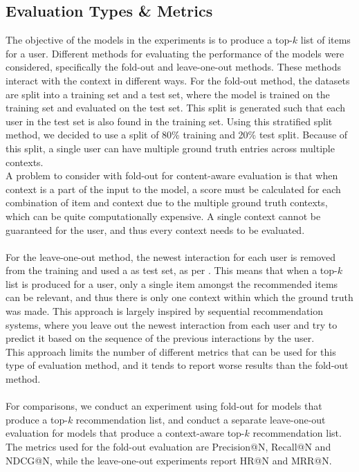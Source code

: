 \subsection{Evaluation Types \& Metrics}\label{subsec:evalandmetrics}
The objective of the models in the experiments is to produce a top-$k$ list of items for a user. 
Different methods for evaluating the performance of the models were considered, specifically the fold-out and leave-one-out methods.
These methods interact with the context in different ways.
For the fold-out method, the datasets are split into a training set and a test set, where the model is trained on the training set and evaluated on the test set. 
This split is generated such that each user in the test set is also found in the training set.
Using this stratified split method, we decided to use a split of 80\% training and 20\% test split.
Because of this split, a single user can have multiple ground truth entries across multiple contexts.\\
A problem to consider with fold-out for content-aware evaluation is that when context is a part of the input to the model, a score must be calculated for each combination of item and context due to the multiple ground truth contexts, which can be quite computationally expensive.
A single context cannot be guaranteed for the user, and thus every context needs to be evaluated.
\\\\
For the leave-one-out method, the newest interaction for each user is removed from the training and used a as test set, as per \cite{CFM, BPR}.
This means that when a top-$k$ list is produced for a user, only a single item amongst the recommended items can be relevant, and thus there is only one context within which the ground truth was made.
This approach is largely inspired by sequential recommendation systems, where you leave out the newest interaction from each user and try to predict it based on the sequence of the previous interactions by the user.\\
This approach limits the number of different metrics that can be used for this type of evaluation method, and it tends to report worse results than the fold-out method.
\\\\
For comparisons, we conduct an experiment using fold-out for models that produce a top-$k$ recommendation list, and conduct a separate leave-one-out evaluation for models that produce a context-aware top-$k$ recommendation list. 
The metrics used for the fold-out evaluation are Precision@N, Recall@N and NDCG@N, while the leave-one-out experiments report HR@N and MRR@N.

